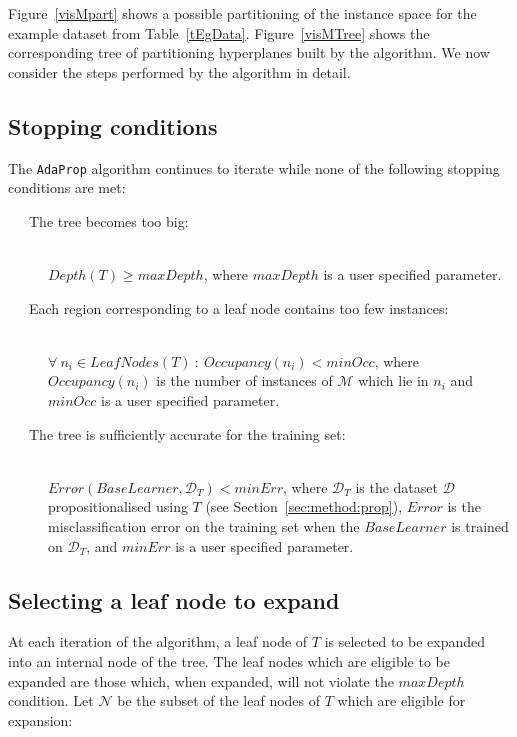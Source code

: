 \documentclass[a4paper,12pt]{report} %
\newcommand{\AdaProp}{\texttt{AdaProp}\xspace}
\newcommand{\mcl}[1]{\mathcal{#1}}
\begin{document}
  
Figure~\ref{visMpart} shows a possible partitioning of 
    the instance space for the example dataset from Table~\ref{tEgData}.
Figure~\ref{visMTree} shows the corresponding tree of partitioning hyperplanes built by
    the algorithm.
We now consider the steps performed by the algorithm in detail.


\subsection{Stopping conditions}
\label{secStopCond}

The \AdaProp algorithm continues to iterate 
	while none of the following stopping conditions are met:
\begin{description}

\item[~~~The tree becomes too big:] \ \\
    $Depth(T) \geq maxDepth$, 
    where  $maxDepth$ is a user specified parameter.
\item[~~~Each region corresponding to a leaf node contains too few instances:] \ \\ 
    $\forall~n_i \in LeafNodes(T) ~:~ Occupancy(n_i) < minOcc$, 
    where $Occupancy(n_i)$ is the number of instances of $\mcl{M}$ which lie in $n_i$ and
    $minOcc$ is a user specified parameter.
\item[~~~The tree is sufficiently accurate for the training set:] \ \\
    $Error(BaseLearner, \mcl{D}_T) < minErr$, 
    where $\mcl{D}_T$ is the dataset $\mcl{D}$ propositionalised using $T$ (see Section~\ref{sec:method:prop}),
    $Error$ is the misclassification error on the training set when 
    the $BaseLearner$ is trained on $\mcl{D}_T$,
    and $minErr$ is a user specified parameter.

\end{description}

\subsection{Selecting a leaf node to expand}
\label{secTreeBuild}

At each iteration of the algorithm, 
    a leaf node of $T$ is selected to be expanded 
    into an internal node of the tree.
The leaf nodes which are eligible to be expanded
    are those which, when expanded, will not 
    violate the $maxDepth$ condition.
Let $\mcl{N}$ be the subset of the leaf nodes of $T$ 
    which are eligible for expansion:
\end{document}
